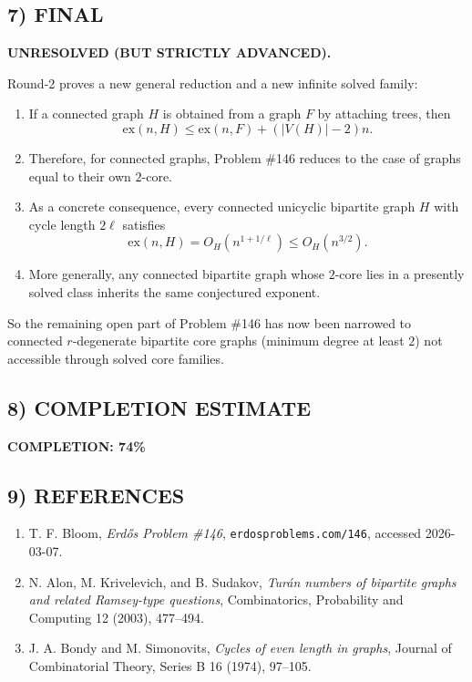 \subsection*{7) FINAL}

\textbf{UNRESOLVED (BUT STRICTLY ADVANCED).}

Round-2 proves a new general reduction and a new infinite solved family:

\begin{enumerate}
\item If a connected graph $H$ is obtained from a graph $F$ by attaching trees, then
\[
\mathrm{ex}(n,H)\le \mathrm{ex}(n,F)+(|V(H)|-2)n.
\]
\item Therefore, for connected graphs, Problem \#146 reduces to the case of graphs equal to their own
$2$-core.
\item As a concrete consequence, every connected unicyclic bipartite graph $H$ with cycle length $2\ell$
satisfies
\[
\mathrm{ex}(n,H)=O_H(n^{1+1/\ell})\le O_H(n^{3/2}).
\]
\item More generally, any connected bipartite graph whose $2$-core lies in a presently solved class
inherits the same conjectured exponent.
\end{enumerate}

So the remaining open part of Problem \#146 has now been narrowed to connected $r$-degenerate
bipartite core graphs (minimum degree at least $2$) not accessible through solved core families.

\subsection*{8) COMPLETION ESTIMATE}

\textbf{COMPLETION: 74\%}

\subsection*{9) REFERENCES}

\begin{enumerate}
\item T. F. Bloom, \emph{Erd\H{o}s Problem \#146}, \texttt{erdosproblems.com/146}, accessed 2026-03-07.
\item N. Alon, M. Krivelevich, and B. Sudakov, \emph{Tur\'an numbers of bipartite graphs and related Ramsey-type questions}, Combinatorics, Probability and Computing 12 (2003), 477--494.
\item J. A. Bondy and M. Simonovits, \emph{Cycles of even length in graphs}, Journal of Combinatorial Theory, Series B 16 (1974), 97--105.
\end{enumerate}
